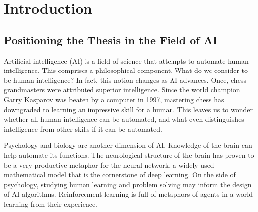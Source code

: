 \newpage
\section{Introduction}






\subsection{Positioning the Thesis in the Field of AI}

Artificial intelligence (AI) is a field of science that attempts to automate human intelligence. 
This comprises a philosophical component. What do we consider to be human intelligence? In fact, this notion changes as AI advances. Once, chess grandmasters were attributed superior intelligence. Since the world champion Garry Kasparov was beaten by a computer in 1997, mastering chess has downgraded to learning an impressive skill for a human. This leaves us to wonder whether all human intelligence can be automated, and what even distinguishes intelligence from other skills if it can be automated.

Psychology and biology are another dimension of AI. Knowledge of the brain can help automate its functions. The neurological structure of the brain has proven to be a very productive metaphor for the neural network, a widely used mathematical model that is the cornerstone of deep learning. On the side of psychology, studying human learning and problem solving may inform the design of AI algorithms. Reinforcement learning is full of metaphors of agents in a world learning from their experience.

